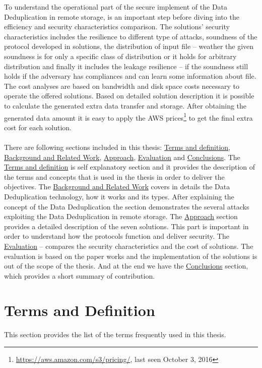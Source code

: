 \documentclass[12pt]{article}
\begin{document}
To understand the operational part of the secure implement of the Data Deduplication in remote storage, is an important step before diving into the efficiency and security characteristics comparison. The solutions' security characteristics includes the resilience to different type of attacks, soundness of the protocol developed in solutions, the distribution of input file --  weather the given soundness is for only a specific class of distribution or it holds for arbitrary distribution and finally it includes the leakage resilience -- if the soundness still holds if the adversary has compliances and can learn some information about file. The cost analyses are based on bandwidth and disk space costs necessary to operate the offered solutions. Based on detailed solution description it is possible to calculate the generated extra data transfer and storage. After obtaining the generated data amount it is easy to apply the  AWS prices\footnote{\url{https://aws.amazon.com/s3/pricing/}, last seen October 3, 2016} to get the final extra cost for each solution.\\\\
There are following sections included in this thesis: \hyperref[sec:2]{Terms and definition}, \hyperref[sec:3]{Background and Related Work}, \hyperref[sec:4]{Approach}, \hyperref[sec:5]{Evaluation} and \hyperref[sec:6]{Conclusions}. The \hyperref[sec:2]{Terms and definition} is self explanatory section and it provides the description of the terms and concepts that is used in the thesis in order to deliver the objectives. The  \hyperref[sec:3]{Background and Related Work} covers in details the Data Deduplication technology, how it works and its types. After explaining the concept of the Data Deduplication the section demonstrates the several attacks exploiting the Data Deduplication in remote storage. The  \hyperref[sec:4]{Approach} section provides a detailed description of the seven solutions. This part is important in order to understand  how the protocols function and deliver security. The \hyperref[sec:5]{Evaluation} -- compares the security characteristics and the cost of solutions. The evaluation is based on the paper works and the implementation of the solutions is out of the scope of the thesis. And at the end we have the \hyperref[sec:6]{Conclusions} section, which provides a short summary of contribution.
\pagebreak
\section{Terms and Definition}
\label{sec:2}
This section provides the list of the terms  frequently  used in this thesis. 
\end{document}
